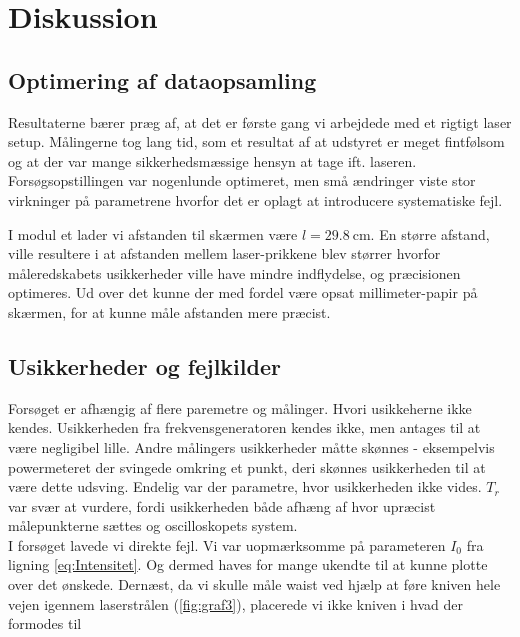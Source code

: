 \documentclass[main]{subfiles}
\begin{document}
\section{Diskussion}
\subsection{Optimering af dataopsamling}
Resultaterne bærer præg af, at det er første gang vi arbejdede med et rigtigt laser setup. Målingerne tog lang tid, som et resultat af at udstyret er meget fintfølsom og at der var mange sikkerhedsmæssige hensyn at tage ift. laseren. Forsøgsopstillingen var nogenlunde optimeret, men små ændringer viste stor virkninger på parametrene hvorfor det er oplagt at introducere systematiske fejl.

I modul et lader vi afstanden til skærmen være $l = \SI{29,8}{\centi\meter}$. En større afstand, ville resultere i at afstanden mellem laser-prikkene blev størrer hvorfor måleredskabets usikkerheder ville have mindre indflydelse, og præcisionen optimeres. Ud over det kunne der med fordel være opsat millimeter-papir på skærmen, for at kunne måle afstanden mere præcist.
\subsection{Usikkerheder og fejlkilder}
Forsøget er afhængig af flere paremetre og målinger. Hvori usikkeherne ikke kendes. Usikkerheden fra frekvensgeneratoren kendes ikke, men antages til at være negligibel lille. Andre målingers usikkerheder måtte skønnes - eksempelvis powermeteret der svingede omkring et punkt, deri skønnes usikkerheden til at være dette udsving. Endelig var der parametre, hvor usikkerheden ikke vides. $T_r$ var svær at vurdere, fordi usikkerheden både afhæng af hvor upræcist målepunkterne sættes og oscilloskopets system.
\\
I forsøget lavede vi direkte fejl. Vi var uopmærksomme på  parameteren $I_0$ fra ligning \cref{eq:Intensitet}. Og dermed haves for mange ukendte til at kunne plotte over det ønskede. Dernæst, da vi skulle måle waist ved hjælp at føre kniven hele vejen igennem laserstrålen (\cref{fig:graf3}), placerede vi ikke kniven i hvad der formodes til 
\\
\end{document}
